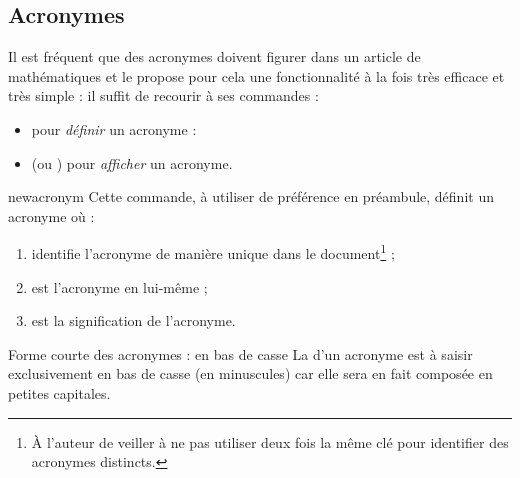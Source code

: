 \documentclass[french,nolocaltoc]{nwejmart}
\newtheorem[style=definition]{fait}
\newtheorem[title=expérience]{experience}
\newtheorem[title-plural=anneaux]{anneau}
\newtheorem[title=idéal,title-plural=idéaux]{ideal}
\begin{document}
%

\subsection{Acronymes}
\label{sec:acronymes}

Il est fréquent que des acronymes doivent figurer dans un article de
mathématiques et le  propose pour cela une fonctionnalité
à la fois très efficace et très simple : il suffit de recourir à ses commandes :
\begin{itemize}
\item {} pour \emph{définir} un acronyme :
\item {} (ou ) pour \emph{afficher} un acronyme.
\end{itemize}

\begin{docCommand}{newacronym}{}
  Cette commande, à utiliser de préférence en préambule, définit un acronyme
  où :
  \begin{enumerate}
  \item {} identifie l'acronyme de manière unique dans le
    document\footnote{À l'auteur de veiller à ne pas utiliser deux fois la même
      clé pour identifier des acronymes distincts.} ;
  \item {} est l'acronyme en lui-même ;
  \item {} est la signification de l'acronyme.
  \end{enumerate}
\begin{dbwarning}{Forme courte des acronymes : en bas de casse}{}
  La  d'un acronyme est à saisir exclusivement en bas de
  casse (en minuscules) car elle sera en fait composée en petites capitales.
\end{dbwarning}
\end{docCommand}
\end{document}
